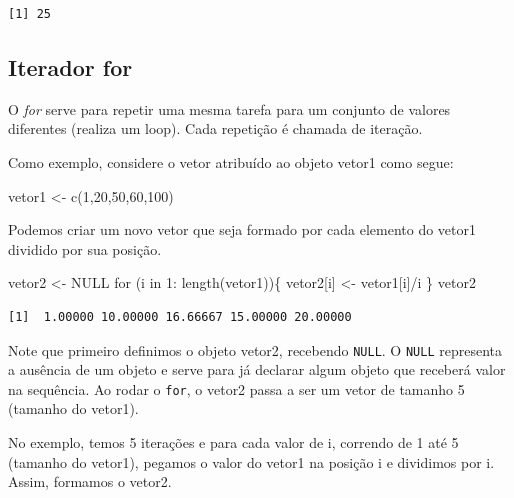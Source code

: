 \documentclass[
  letterpaper,
  DIV=11,
  numbers=noendperiod]{scrreprt}
\newenvironment{Shaded}{\begin{snugshade}}{\end{snugshade}}
\newcommand{\ConstantTok}[1]{\textcolor[rgb]{0.56,0.35,0.01}{#1}}
\newcommand{\ControlFlowTok}[1]{\textcolor[rgb]{0.00,0.23,0.31}{#1}}
\newcommand{\DecValTok}[1]{\textcolor[rgb]{0.68,0.00,0.00}{#1}}
\newcommand{\FunctionTok}[1]{\textcolor[rgb]{0.28,0.35,0.67}{#1}}
\newcommand{\NormalTok}[1]{\textcolor[rgb]{0.00,0.23,0.31}{#1}}
\newcommand{\OtherTok}[1]{\textcolor[rgb]{0.00,0.23,0.31}{#1}}
\newcommand{\SpecialCharTok}[1]{\textcolor[rgb]{0.37,0.37,0.37}{#1}}
\begin{document}
\begin{verbatim}
[1] 25
\end{verbatim}

\hypertarget{iterador-for}{%
\subsection{Iterador for}\label{iterador-for}}

O \emph{for} serve para repetir uma mesma tarefa para um conjunto de
valores diferentes (realiza um loop). Cada repetição é chamada de
iteração.

Como exemplo, considere o vetor atribuído ao objeto vetor1 como segue:

\begin{Shaded}
\begin{Highlighting}[]
\NormalTok{vetor1 }\OtherTok{\textless{}{-}} \FunctionTok{c}\NormalTok{(}\DecValTok{1}\NormalTok{,}\DecValTok{20}\NormalTok{,}\DecValTok{50}\NormalTok{,}\DecValTok{60}\NormalTok{,}\DecValTok{100}\NormalTok{)}
\end{Highlighting}
\end{Shaded}

Podemos criar um novo vetor que seja formado por cada elemento do vetor1
dividido por sua posição.

\begin{Shaded}
\begin{Highlighting}[]
\NormalTok{vetor2 }\OtherTok{\textless{}{-}} \ConstantTok{NULL}
\ControlFlowTok{for}\NormalTok{ (i }\ControlFlowTok{in} \DecValTok{1}\SpecialCharTok{:} \FunctionTok{length}\NormalTok{(vetor1))\{}
\NormalTok{  vetor2[i] }\OtherTok{\textless{}{-}}\NormalTok{ vetor1[i]}\SpecialCharTok{/}\NormalTok{i}
\NormalTok{\}}
\NormalTok{vetor2}
\end{Highlighting}
\end{Shaded}

\begin{verbatim}
[1]  1.00000 10.00000 16.66667 15.00000 20.00000
\end{verbatim}

Note que primeiro definimos o objeto vetor2, recebendo \texttt{NULL}. O
\texttt{NULL} representa a ausência de um objeto e serve para já
declarar algum objeto que receberá valor na sequência. Ao rodar o
\texttt{for}, o vetor2 passa a ser um vetor de tamanho 5 (tamanho do
vetor1).

No exemplo, temos 5 iterações e para cada valor de i, correndo de 1 até
5 (tamanho do vetor1), pegamos o valor do vetor1 na posição i e
dividimos por i. Assim, formamos o vetor2.
\end{document}
